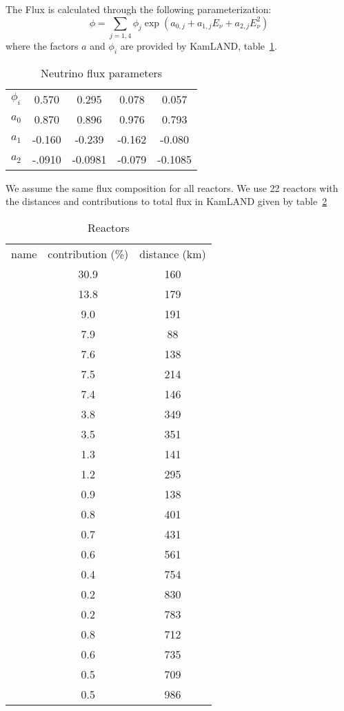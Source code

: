 \documentclass[12pt]{article}
\begin{document}
The Flux is calculated through the following parameterization:
\[
\phi=\sum_{j=1,4}\phi_j\exp{\left(a_{0,j}+a_{1,j}E_\nu+a_{2,j}E_\nu^2\right)}
\]
where the factors $a$ and $\phi_i$ are provided by KamLAND, table~\ref{tab:nuflux}.

\begin{table}[h!]
  \begin{center}
    \caption{Neutrino flux parameters}
    \label{tab:nuflux}
    \begin{tabular}{l|c|c|c|c}
      \hline
      $\phi_i$ & 0.570 & 0.295 & 0.078 & 0.057\\
      $a_0$ & 0.870 & 0.896 & 0.976 & 0.793\\
      $a_1$ &-0.160 &-0.239 &-0.162 &-0.080\\
      $a_2$ &-.0910 &-0.0981&-0.079 &-0.1085\\
      \hline
    \end{tabular}
  \end{center}
\end{table}

We assume the same flux composition for all reactors. We use 22 reactors with the distances and contributions to total flux in KamLAND given by table~\ref{tab:reactors}
        
\begin{table}[h!]
  \begin{center}
    \caption{Reactors}
    \label{tab:reactors}
    \begin{tabular}{l|c|c}
      \hline
      name & contribution (\%) & distance (km)\\
      &30.9 &160 \\
      &13.8 &179 \\
      &9.0  &191 \\
      &7.9  & 88 \\
      &7.6  &138 \\
      &7.5  &214 \\
      &7.4  &146 \\
      &3.8  &349 \\
      &3.5  &351 \\
      &1.3  &141 \\
      &1.2  &295 \\
      &0.9  &138 \\
      &0.8  &401 \\
      &0.7  &431 \\
      &0.6  &561 \\
      &0.4  &754 \\
      &0.2  &830 \\
      &0.2  &783 \\
      &0.8  &712 \\
      &0.6  &735 \\
      &0.5  &709 \\
      &0.5  &986 \\
      \hline
    \end{tabular}
  \end{center}
\end{table}
\end{document}

